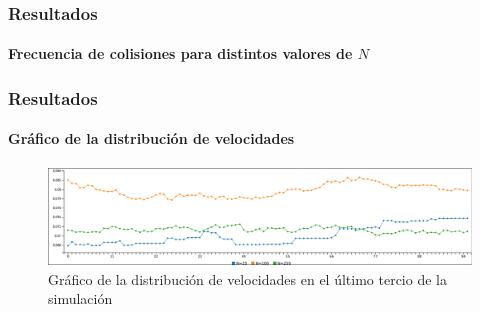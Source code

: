 \documentclass[hyperref={pdfpagelayout=SinglePage}]{beamer}
\begin{document}
\begin{frame}
\frametitle{Resultados}
\framesubtitle{Frecuencia de colisiones para distintos valores de $N$}
\begin{center}
\begin{table}[h]
\centering
{}
\caption{Frecuencia de colisiones para distintos valores de $N$.}
\end{table}
\end{center}
\end{frame}

\begin{frame}
\frametitle{Resultados}
\framesubtitle{Gráfico de la distribución de velocidades}
\begin{figure}[H]
        \centering
        \includegraphics[width=\textwidth]{graphs/velocities.png}
        \caption{Gráfico de la distribución de velocidades en el último tercio de la simulación}
\end{figure}
\end{frame}
\end{document}
